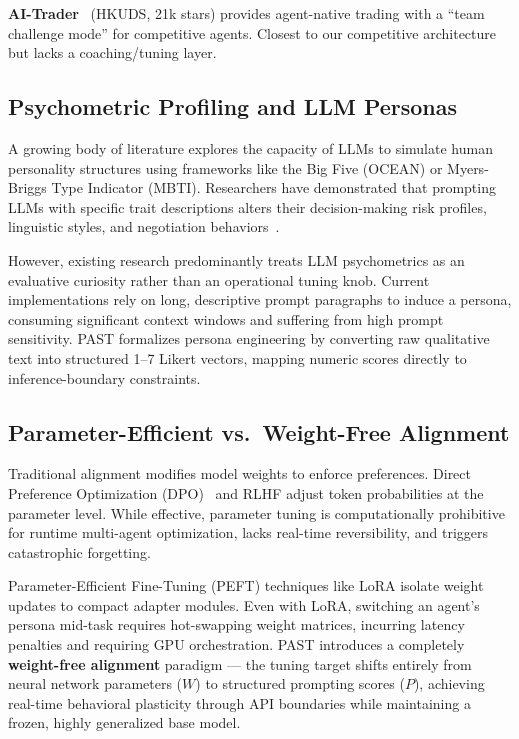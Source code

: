 \documentclass[11pt]{article}
\begin{document}
\textbf{AI-Trader}~\citep{fan2026aitrader} (HKUDS, 21k stars) provides agent-native trading with a ``team challenge mode'' for competitive agents. Closest to our competitive architecture but lacks a coaching/tuning layer.

\subsection{Psychometric Profiling and LLM Personas}\label{psychometric-profiling-and-llm-personas}

A growing body of literature explores the capacity of LLMs to simulate human personality structures using frameworks like the Big Five (OCEAN) or Myers-Briggs Type Indicator (MBTI). Researchers have demonstrated that prompting LLMs with specific trait descriptions alters their decision-making risk profiles, linguistic styles, and negotiation behaviors~\citep{hartley2025personality,wang2025risk}.

However, existing research predominantly treats LLM psychometrics as an evaluative curiosity rather than an operational tuning knob. Current implementations rely on long, descriptive prompt paragraphs to induce a persona, consuming significant context windows and suffering from high prompt sensitivity. PAST formalizes persona engineering by converting raw qualitative text into structured 1--7 Likert vectors, mapping numeric scores directly to inference-boundary constraints.

\subsection{Parameter-Efficient vs.~Weight-Free Alignment}\label{parameter-efficient-vs.-weight-free-alignment}

Traditional alignment modifies model weights to enforce preferences. Direct Preference Optimization (DPO)~\citep{rafailov2023dpo} and RLHF adjust token probabilities at the parameter level. While effective, parameter tuning is computationally prohibitive for runtime multi-agent optimization, lacks real-time reversibility, and triggers catastrophic forgetting.

Parameter-Efficient Fine-Tuning (PEFT) techniques like LoRA isolate weight updates to compact adapter modules. Even with LoRA, switching an agent's persona mid-task requires hot-swapping weight matrices, incurring latency penalties and requiring GPU orchestration. PAST introduces a completely \textbf{weight-free alignment} paradigm --- the tuning target shifts entirely from neural network parameters (\(W\)) to structured prompting scores (\(P\)), achieving real-time behavioral plasticity through API boundaries while maintaining a frozen, highly generalized base model.
\end{document}
